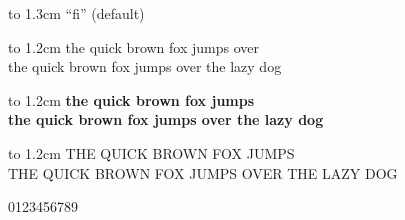 \documentclass[10pt]{article}
\begin{document}
\newfontfamily{}



\vbox to 1.3cm{ %
{\LARGE ``fi''} (default)\\
\myfont\selectfont {\LARGE ``fi''} %
}

\vbox to 1.2cm{
the quick brown fox jumps over\\
\myfont\selectfont the quick brown fox jumps over the lazy dog
}

\vbox to 1.2cm{
\bfseries the quick brown fox jumps\\
\myfont\selectfont \bfseries the quick brown fox jumps over the lazy dog
}

\vbox to 1.2cm{
THE QUICK BROWN FOX JUMPS\\
\myfont\selectfont THE QUICK BROWN FOX JUMPS OVER THE LAZY DOG
}

\vbox{
0123456789 \myfont{}
}
\end{document}
